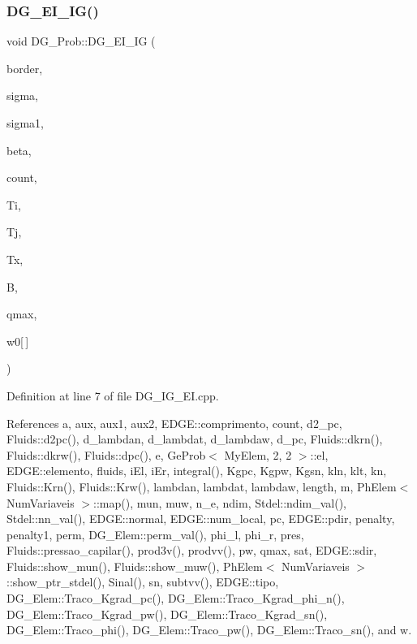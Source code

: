 \subsubsection{\texorpdfstring{D\+G\+\_\+\+E\+I\+\_\+\+I\+G()}{DG\_EI\_IG()}}
{\footnotesize\ttfamily void D\+G\+\_\+\+Prob\+::\+D\+G\+\_\+\+E\+I\+\_\+\+IG (\begin{DoxyParamCaption}\item[{const \hyperlink{structEDGE}{E\+D\+GE}}]{border,  }\item[{const double}]{sigma,  }\item[{const double}]{sigma1,  }\item[{const double}]{beta,  }\item[{int \&}]{count,  }\item[{int $\ast$}]{Ti,  }\item[{int $\ast$}]{Tj,  }\item[{double $\ast$}]{Tx,  }\item[{double $\ast$}]{B,  }\item[{const int}]{qmax,  }\item[{const double}]{w0\mbox{[}$\,$\mbox{]} }\end{DoxyParamCaption})}



Definition at line 7 of file D\+G\+\_\+\+I\+G\+\_\+\+E\+I.\+cpp.



References a, aux, aux1, aux2, E\+D\+G\+E\+::comprimento, count, d2\+\_\+pc, Fluids\+::d2pc(), d\+\_\+lambdan, d\+\_\+lambdat, d\+\_\+lambdaw, d\+\_\+pc, Fluids\+::dkrn(), Fluids\+::dkrw(), Fluids\+::dpc(), e, Ge\+Prob$<$ My\+Elem, 2, 2 $>$\+::el, E\+D\+G\+E\+::elemento, fluids, i\+El, i\+Er, integral(), Kgpc, Kgpw, Kgsn, kln, klt, kn, Fluids\+::\+Krn(), Fluids\+::\+Krw(), lambdan, lambdat, lambdaw, length, m, Ph\+Elem$<$ Num\+Variaveis $>$\+::map(), mun, muw, n\+\_\+e, ndim, Stdel\+::ndim\+\_\+val(), Stdel\+::nn\+\_\+val(), E\+D\+G\+E\+::normal, E\+D\+G\+E\+::num\+\_\+local, pc, E\+D\+G\+E\+::pdir, penalty, penalty1, perm, D\+G\+\_\+\+Elem\+::perm\+\_\+val(), phi\+\_\+l, phi\+\_\+r, pres, Fluids\+::pressao\+\_\+capilar(), prod3v(), prodvv(), pw, qmax, sat, E\+D\+G\+E\+::sdir, Fluids\+::show\+\_\+mun(), Fluids\+::show\+\_\+muw(), Ph\+Elem$<$ Num\+Variaveis $>$\+::show\+\_\+ptr\+\_\+stdel(), Sinal(), sn, subtvv(), E\+D\+G\+E\+::tipo, D\+G\+\_\+\+Elem\+::\+Traco\+\_\+\+Kgrad\+\_\+pc(), D\+G\+\_\+\+Elem\+::\+Traco\+\_\+\+Kgrad\+\_\+phi\+\_\+n(), D\+G\+\_\+\+Elem\+::\+Traco\+\_\+\+Kgrad\+\_\+pw(), D\+G\+\_\+\+Elem\+::\+Traco\+\_\+\+Kgrad\+\_\+sn(), D\+G\+\_\+\+Elem\+::\+Traco\+\_\+phi(), D\+G\+\_\+\+Elem\+::\+Traco\+\_\+pw(), D\+G\+\_\+\+Elem\+::\+Traco\+\_\+sn(), and w.



